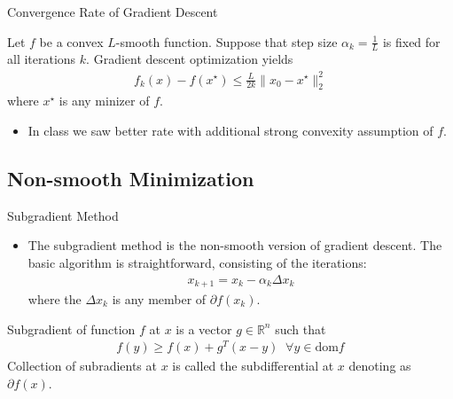 \documentclass{beamer}
\begin{document}
\begin{frame}{Convergence Rate of Gradient Descent}
    \begin{theorem}[GD Convergence]
         Let $f$ be a convex $L$-smooth function. Suppose that step size $\alpha_k=\frac{1}{L}$ is fixed for all iterations $k$. Gradient descent optimization yields
         \begin{align*}
            f_k(x)-f(x^\star)\leq\frac{L}{2 k}\|x_0-x^\star\|_2^2
         \end{align*}
         where $x^\star$ is any minizer of $f$.
    \end{theorem} 
    \pause
    \begin{itemize}
        \item In class we saw better rate with additional strong convexity assumption of $f$.
    \end{itemize}
\end{frame}


\subsection{Non-smooth Minimization}

\begin{frame}{Subgradient Method}
\begin{itemize}
    \item The subgradient method is the non-smooth version of gradient descent. The basic algorithm is straightforward, consisting of the iterations:
    \begin{align*}
        x_{k+1}=x_k-\alpha_k\Delta x_k
    \end{align*}
    where the $\Delta x_k$ is any member of $\partial f(x_k)$.
\end{itemize}
\pause\vspace{5pt}
\begin{definition}[Subgradient]
    Subgradient of function $f$ at $x$ is a vector $g\in\mathbb{R}^n$ such that
    \begin{align*}
        f(y)\geq f(x)+g^T(x-y) \;\;\forall y\in\mathrm{dom}f
    \end{align*}
    Collection of subradients at $x$ is called the subdifferential at $x$ denoting as $\partial f(x)$.
\end{definition}
\end{frame}
\end{document}
